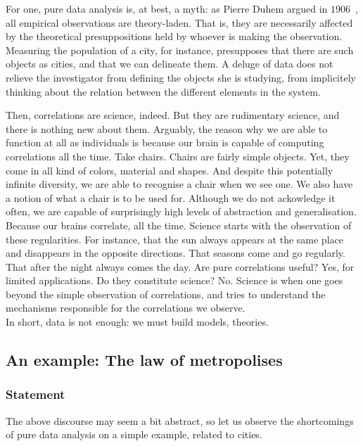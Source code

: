 For one, pure data analysis is, at best, a myth: as Pierre Duhem argued in
$1906$~\cite{Duhem:1997}, all empirical observations are theory-laden. That is,
they are necessarily affected by the theoretical presuppositions held by whoever
is making the observation. Measuring the population of a city, for instance,
presupposes that there are such objects as cities, and that we can delineate
them. A deluge of data does not relieve the investigator from defining the
objects she is studying, from implicitely thinking about the relation between
the different elements in the system.

Then, correlations are science, indeed. But they are rudimentary science, and
there is nothing new about them. Arguably, the reason why we are able to
function at all as individuals is because our brain is capable of computing
correlations all the time. Take chairs. Chairs are fairly simple objects. Yet,
they come in all kind of colors, material and shapes. And despite this
potentially infinite diversity, we are able to recognise a chair when we see
one. We also have a notion of what a chair is to be used for. Although we do not
ackowledge it often, we are capable of surprisingly high levels of abstraction
and generalisation. Because our brains correlate, all the time. Science starts with the
observation of these regularities. For instance, that the sun always appears at
the same place and disappears in the opposite directions. That seasons come and
go regularly. That after the night always comes the day. Are pure correlations useful? Yes, for
limited applications. Do they constitute science? No. Science is when one goes
beyond the simple observation of correlations, and tries 
to understand the mechanisms responsible for the correlations we observe.\\

In short, data is not enough: we must build models, theories.


\subsection{An example: The law of metropolises}
\label{sec:an_example_the_law_of_metropolises}

\subsubsection{Statement}
\label{sub:statement}

The above discourse may seem a bit abstract, so let us observe the shortcomings
of pure data analysis on a simple example, related to cities.

